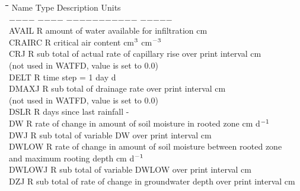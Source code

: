 \documentclass[11pt]{article}
\begin{document}
\begin{tabbing}
\hspace{1.27cm}\=\hspace{1.27cm}\=\hspace{1.27cm}\=\hspace{1.27cm}\=%
\hspace{1.27cm}\=\hspace{1.27cm}\=\hspace{1.27cm}\=\hspace{1.27cm}\=%
\hspace{1.27cm}\=\hspace{1.27cm}\=\kill
Name    \> \> Type   \> Description                                        \> \> \> \> \> \> \> Units\\
$-$$-$$-$$-$    \> \> $-$$-$$-$$-$   \> $-$$-$$-$$-$$-$$-$$-$$-$$-$$-$$-$                                        \> \> \> \> \> \> \> $-$$-$$-$$-$$-$\\
AVAIL\> \> R\> amount of water available for infiltration\> \> \> \> \> \> \> cm\\
CRAIRC\> \> R\> critical air content\> \> \> \> \> \> \> cm$^{{\rm 3}}$ cm$^{{\rm -3}}$\\
CRJ\> \> R\> sub total of actual rate of capillary rise over print interval\> \> \> \> \> \> \> cm\\
\>\> \> (not used in WATFD, value is set to 0.0)\\
DELT\> \> R\> time step = 1 day\> \> \> \> \> \> \> d\\
DMAXJ\> \> R\> sub total of drainage rate over print interval\> \> \> \> \> \> \> cm\\
\>\> \> (not used in WATFD, value is set to 0.0)\\
DSLR\> \> R\> days since last rainfall\> \> \> \> \> \> \> -\\
DW\> \> R\> rate of change in amount of soil moisture in rooted zone\> \> \> \> \> \> \> cm d$^{{\rm -1}}$\\
DWJ\> \> R\> sub total of variable DW over print interval\> \> \> \> \> \> \> cm  \\
DWLOW\> \> R\> rate of change in amount of soil moisture between rooted zone \\
\>\> \> and maximum rooting depth\> \> \> \> \> \> \> cm d$^{{\rm -1}}$\\
DWLOWJ\> \> R\> sub total of variable DWLOW over print interval\> \> \> \> \> \> \> cm \\
DZJ\> \> R\> sub total of rate of change in groundwater depth over print interval\> \> \> \> \> \> \> cm\\

\end{tabbing}
\end{document}

